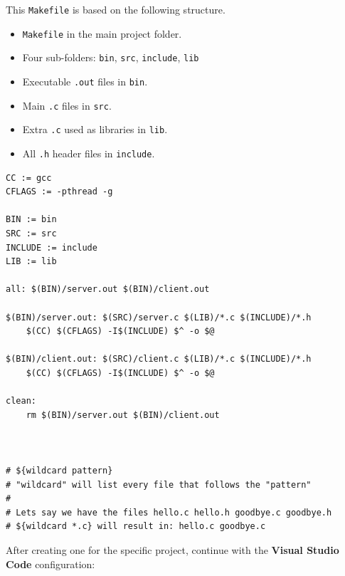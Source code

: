 This \texttt{Makefile} is based on the following structure.
\begin{itemize}
    \item \texttt{Makefile} in the main project folder.
    \item Four sub-folders: \texttt{bin}, \texttt{src}, \texttt{include}, \texttt{lib}
    \item Executable \texttt{.out} files in \texttt{bin}.
    \item Main \texttt{.c} files in \texttt{src}.
    \item Extra \texttt{.c} used as libraries in \texttt{lib}.
    \item All \texttt{.h} header files in \texttt{include}.
\end{itemize}

\begin{verbatim}
CC := gcc
CFLAGS := -pthread -g

BIN := bin
SRC := src
INCLUDE := include
LIB := lib

all: $(BIN)/server.out $(BIN)/client.out

$(BIN)/server.out: $(SRC)/server.c $(LIB)/*.c $(INCLUDE)/*.h
	$(CC) $(CFLAGS) -I$(INCLUDE) $^ -o $@

$(BIN)/client.out: $(SRC)/client.c $(LIB)/*.c $(INCLUDE)/*.h
	$(CC) $(CFLAGS) -I$(INCLUDE) $^ -o $@

clean:
	rm $(BIN)/server.out $(BIN)/client.out



# ${wildcard pattern}
# "wildcard" will list every file that follows the "pattern"
#
# Lets say we have the files hello.c hello.h goodbye.c goodbye.h
# ${wildcard *.c} will result in: hello.c goodbye.c
\end{verbatim}

After creating one for the specific project, continue with the \textbf{Visual Studio Code} configuration:

